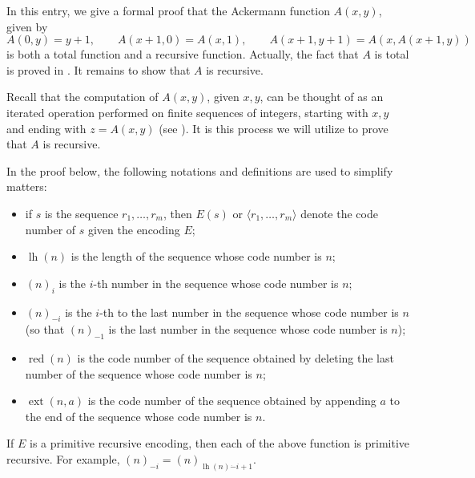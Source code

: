 \documentclass[12pt]{article}
\begin{document}
In this entry, we give a formal proof that the Ackermann function $A(x,y)$, given by $$A(0,y)=y+1,\qquad A(x+1,0)=A(x,1),\qquad A(x+1,y+1)=A(x,A(x+1,y))$$
is both a total function and a recursive function.  Actually, the fact that $A$ is total is proved in .  It remains to show that $A$ is recursive.

Recall that the computation of $A(x,y)$, given $x,y$, can be thought of as an iterated operation performed on finite sequences of integers, starting with $x,y$ and ending with $z=A(x,y)$ (see ).  It is this process we will utilize to prove that $A$ is recursive.

In the proof below, the following notations and definitions are used to simplify matters:
\begin{itemize}
\item if $s$ is the sequence $r_1,\ldots, r_m$, then $E(s)$ or $\langle r_1,\ldots, r_m\rangle$ denote the code number of $s$ given the encoding $E$;
\item $\operatorname{lh}(n)$ is the length of the sequence whose code number is $n$;
\item $(n)_i$ is the $i$-th number in the sequence whose code number is $n$;
\item $(n)_{-i}$ is the $i$-th to the last number in the sequence whose code number is $n$ (so that $(n)_{-1}$ is the last number in the sequence whose code number is $n$);
\item $\operatorname{red}(n)$ is the code number of the sequence obtained by deleting the last number of the sequence whose code number is $n$;
\item $\operatorname{ext}(n,a)$ is the code number of the sequence obtained by appending $a$ to the end of the sequence whose code number is $n$.
\end{itemize}
If $E$ is a primitive recursive encoding, then each of the above function is primitive recursive.  For example, $(n)_{-i}=(n)_{\operatorname{lh}(n)\dot{-}i+1}$.
\end{document}
